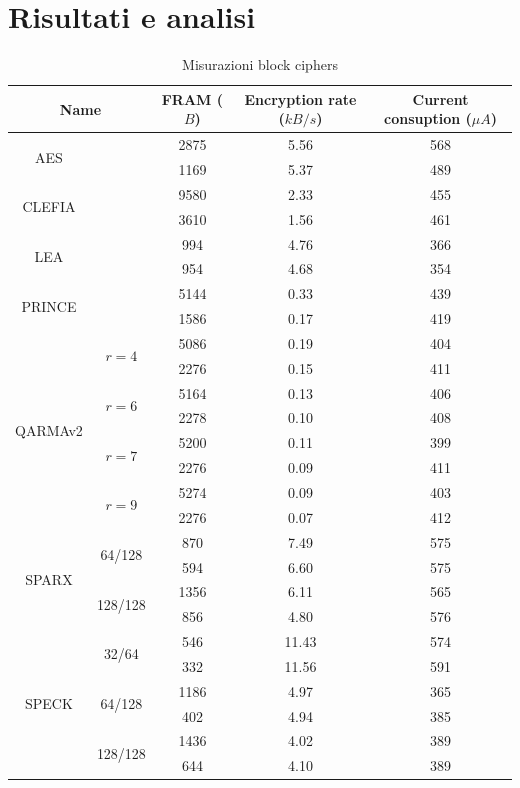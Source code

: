 \documentclass[target=bach,aauheader=,style=]{thud}
\begin{document}
	\section{Risultati e analisi}
	\begin{table}
		\begin{center}
			\begin{tabular}{ccccc}
			\hline
			\multicolumn{2}{c}{\textbf{Name}} & \textbf{FRAM ($B$)} & \textbf{Encryption rate ($kB/s$)} & \textbf{Current consuption} ($\mu A$) \\
			\hline
			\hline
		    \multirow{2}{*}{AES} & & 2875 & 5.56 & 568\\
		    					 & & 1169 & 5.37 & 489\\
		    \hline
		    \multirow{2}{*}{CLEFIA} & & 9580 & 2.33 & 455\\
		    						& & 3610 & 1.56 & 461\\
		    \hline
		    \multirow{2}{*}{LEA} & & 994 & 4.76 & 366\\
		    					 & & 954 & 4.68 & 354\\
		    \hline
		    \multirow{2}{*}{PRINCE} & & 5144 & 0.33 & 439\\
		    						& & 1586 & 0.17 & 419\\
		    \hline
		    \multirow{8}{*}{QARMAv2} & \multirow{2}{*}{$r=4$} & 5086 & 0.19 & 404\\
		    						 &						  & 2276 & 0.15 & 411\\
		    						 & \multirow{2}{*}{$r=6$} & 5164 & 0.13 & 406\\
		    						 &						  & 2278 & 0.10 & 408\\
		    						 & \multirow{2}{*}{$r=7$} & 5200 & 0.11 & 399\\
		    						 &						  & 2276 & 0.09 & 411\\
		    						 & \multirow{2}{*}{$r=9$} & 5274 & 0.09 & 403\\
		    						 &						  & 2276 & 0.07 & 412\\
			\hline
			\multirow{4}{*}{SPARX} & \multirow{2}{*}{64/128} & 870 & 7.49 & 575\\
								   &						 & 594 & 6.60 & 575\\
								   & \multirow{2}{*}{128/128} & 1356 & 6.11 & 565\\
								   &						  & 856 & 4.80 & 576\\
			\hline
			\multirow{6}{*}{SPECK} & \multirow{2}{*}{32/64} & 546 & 11.43 & 574\\
								   &						& 332 & 11.56 & 591\\
								   & \multirow{2}{*}{64/128} & 1186 & 4.97 & 365\\
								   &						 & 402 & 4.94 & 385\\
								   & \multirow{2}{*}{128/128} & 1436 & 4.02 & 389\\
								   &						 & 644 & 4.10 & 389\\
			\hline
		    
		\end{tabular}
		\end{center}
		\caption{Misurazioni block ciphers}
	\end{table}
\end{document}
